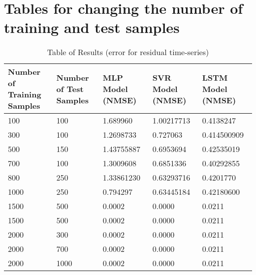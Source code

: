 \documentclass{article}
\begin{document}
\section{Tables for changing the number of training and test samples}
\begin{table}[ht]
	\centering
	\begin{tabular}{p{2cm} p{2cm} p{2cm} p{2cm} p{2cm}}
		\toprule
		Number of Training Samples & Number of Test Samples & MLP Model (NMSE) & SVR Model (NMSE) & LSTM Model (NMSE) \\
		\midrule
		100 & 100 & 1.689960 & 1.00217713 & 0.4138247 \\
		\midrule
		300 & 100 & 1.2698733 & 0.727063  & 0.414500909 \\
		\midrule
		500 & 150 & 1.43755887 & 0.6953694 & 0.42535019 \\
		\midrule
		700 & 100 & 1.3009608 & 0.6851336 & 0.40292855 \\
		\midrule
		800 & 250 & 1.33861230 & 0.63293716 & 0.4201770 \\
		\midrule
		1000 & 250 & 0.794297 & 0.63445184 & 0.42180600 \\
		\midrule
		1500 & 500 & 0.0002 & 0.0000 & 0.0211 \\
		\midrule
		1500 & 500 & 0.0002 & 0.0000 & 0.0211 \\
		\midrule
		2000 & 300 & 0.0002 & 0.0000 & 0.0211 \\
		\midrule
		2000 & 700 & 0.0002 & 0.0000 & 0.0211 \\
		\midrule
		2000 & 1000 & 0.0002 & 0.0000 & 0.0211 \\
		\bottomrule
	\end{tabular}
	\caption{Table of Results (error for residual time-series)}
\end{table}
\end{document}
